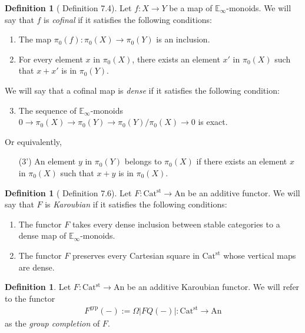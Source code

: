 \documentclass[a4paper,dvipdfmx,11pt,reqno]{amsart}
\DeclareMathOperator{\grp}{grp}
\newcommand{\An}{\mathrm{An}}
\newcommand{\Catst}{\mathrm{Cat^{st}}}
\newcommand{\Einf}{\mathbb{E}_{\infty}}
\theoremstyle{definition}
\newtheorem{definition}[theorem]{Definition}
\begin{document}
\begin{definition}[\cite{HLS23} Definition 7.4] \label{HLS23.def.7.4}
  Let $f : X \to Y$ be a map of $\Einf$-monoids.
  We will say that $f$ is \textit{cofinal} if it satisfies the following conditions:
  \begin{enumerate}
    \item The map $\pi_0(f) : \pi_0(X) \to \pi_0(Y)$ is an inclusion.
    \item For every element $x$ in $\pi_0(X)$, there exists an element $x'$ in $\pi_0(X)$ such that $x+x'$ is in $\pi_0(Y)$.
  \end{enumerate}
  We will say that a cofinal map is \textit{dense} if it satisfies the following condition:
  \begin{enumerate}[resume]
    \setcounter{enumi}{2}
    \item The sequence of $\Einf$-monoids $0 \to \pi_0(X) \to \pi_0(Y) \to \pi_0(Y)/\pi_0(X) \to 0$ is exact. 
  \end{enumerate}
  Or equivalently, 
  \begin{itemize}
    \item[(3')] An element $y$ in $\pi_0(Y)$ belongs to $\pi_0(X)$ if there exists an element $x$ in $\pi_0(X)$ such that $x+y$ is in $\pi_0(X)$.
  \end{itemize}
\end{definition}

\begin{definition}[\cite{HLS23} Definition 7.6] \label{HLS23.def.7.6}
  Let $F : \Catst \to \An$ be an additive functor.
  We will say that $F$ is \textit{Karoubian} if it satisfies the following conditions:
  \begin{enumerate}
    \item The functor $F$ takes every dense inclusion between stable categories to a dense map of $\Einf$-monoids.
    \item The functor $F$ preserves every Cartesian square in $\Catst$ whose vertical maps are dense.
  \end{enumerate}
\end{definition}

\begin{definition} \label{Ber.p171}
  Let $F : \Catst \to \An$ be an additive Karoubian functor.
  We will refer to the functor
  \begin{align*}
    F^{\grp}(-) := \Omega|FQ(-)| : \Catst \to \An
  \end{align*}
  as the \textit{group completion} of $F$.
\end{definition}
\end{document}
